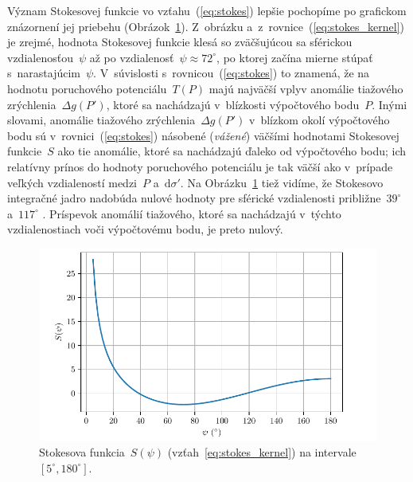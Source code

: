 \documentclass[a4paper,12pt]{book}
\newcommand{\diff}{\mathrm d}
\begin{document}
Význam Stokesovej funkcie vo vzťahu~(\ref{eq:stokes}) lepšie pochopíme po 
grafickom znázornení jej priebehu (Obrázok~\ref{fig:stokes_kernel}).  Z~obrázku 
a~z~rovnice~(\ref{eq:stokes_kernel}) je zrejmé, hodnota Stokesovej funkcie 
klesá so zväčšujúcou sa sférickou vzdialenosťou~$\psi$ až po vzdialenosť~$\psi 
\approx 72^\circ$, po ktorej začína mierne stúpať s~narastajúcim~$\psi$.  
V~súvislosti s~rovnicou~(\ref{eq:stokes}) to znamená, že na hodnotu poruchového 
potenciálu~$T(P)$ majú najväčší vplyv anomálie tiažového zrýchlenia~$\Delta 
g(P')$, ktoré sa nachádzajú v~blízkosti výpočtového bodu~$P$.  Inými slovami, 
anomálie tiažového zrýchlenia~$\Delta g(P')$ v~blízkom okolí výpočtového bodu 
sú v~rovnici~(\ref{eq:stokes}) násobené (\emph{vážené}) väčšími hodnotami 
Stokesovej funkcie~$S$ ako tie anomálie, ktoré sa nachádzajú ďaleko od 
výpočtového bodu; ich relatívny prínos do hodnoty poruchového potenciálu je tak 
väčší ako v~prípade veľkých vzdialeností medzi~$P$ a~$\diff\sigma'$.  Na 
Obrázku~\ref{fig:stokes_kernel} tiež vidíme, že Stokesovo integračné jadro 
nadobúda nulové hodnoty pre sférické vzdialenosti približne~$39^\circ$ 
a~$117^\circ$ \parencite{TorgeGeodesy}.  Príspevok anomálií tiažového, ktoré sa 
nachádzajú v~týchto vzdialenostiach voči výpočtovému bodu, je preto nulový.

\begin{figure}[bt]
\centering
\includegraphics{./fig-stokes-kernel.pdf}
\caption{Stokesova funkcia~$S(\psi)$ (vzťah~\ref{eq:stokes_kernel}) na 
intervale~$[5^\circ, 180^\circ]$.}
\label{fig:stokes_kernel}
\end{figure}
\end{document}
